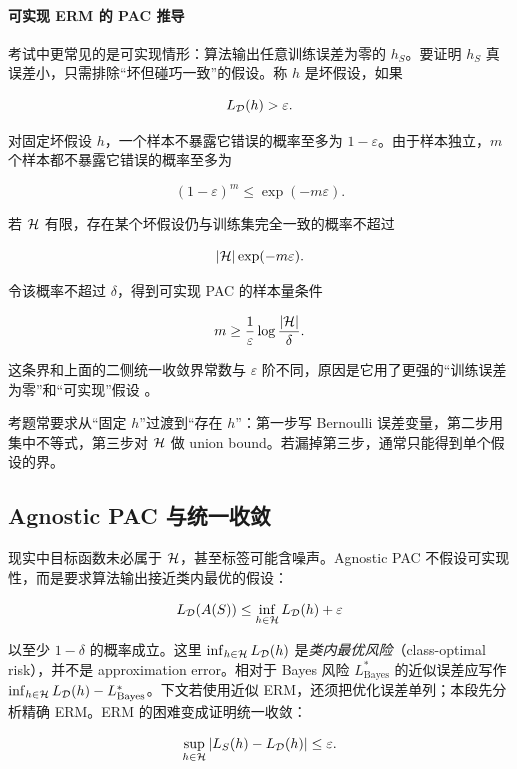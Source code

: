 \paragraph{可实现 ERM 的 PAC 推导}

考试中更常见的是可实现情形：算法输出任意训练误差为零的 \(h_S\)。要证明 \(h_S\) 真误差小，只需排除“坏但碰巧一致”的假设。称 \(h\) 是坏假设，如果

\[
  L_{\mathcal{D}}(h)>\varepsilon.
\]

对固定坏假设 \(h\)，一个样本不暴露它错误的概率至多为 \(1-\varepsilon\)。由于样本独立，\(m\) 个样本都不暴露它错误的概率至多为

\[
  (1-\varepsilon)^m
  \le
  \exp(-m\varepsilon).
\]

若 \(\mathcal{H}\) 有限，存在某个坏假设仍与训练集完全一致的概率不超过

\[
  |\mathcal{H}|\exp(-m\varepsilon).
\]

令该概率不超过 \(\delta\)，得到可实现 PAC 的样本量条件

\[
  m
  \ge
  \frac{1}{\varepsilon}
  \log\frac{|\mathcal{H}|}{\delta}.
\]

这条界和上面的二侧统一收敛界常数与 \(\varepsilon\) 阶不同，原因是它用了更强的“训练误差为零”和“可实现”假设 \parencite{shalev2014uml,mohri2018foundations}。

\examnote
考题常要求从“固定 \(h\)”过渡到“存在 \(h\)”：第一步写 Bernoulli 误差变量，第二步用集中不等式，第三步对 \(\mathcal{H}\) 做 union bound。若漏掉第三步，通常只能得到单个假设的界。

\subsection{Agnostic PAC 与统一收敛}


现实中目标函数未必属于 \(\mathcal{H}\)，甚至标签可能含噪声。Agnostic PAC 不假设可实现性，而是要求算法输出接近类内最优的假设：

\[
  L_{\mathcal{D}}(A(S))
  \le
  \inf_{h\in\mathcal{H}}L_{\mathcal{D}}(h)+\varepsilon
\]

以至少 \(1-\delta\) 的概率成立。这里 \(\inf_{h\in\mathcal{H}}L_{\mathcal{D}}(h)\) 是\emph{类内最优风险}（class-optimal risk），并不是 approximation error。相对于 Bayes 风险 \(L^*_{\mathrm{Bayes}}\) 的近似误差应写作 \(\inf_{h\in\mathcal{H}}L_{\mathcal{D}}(h)-L^*_{\mathrm{Bayes}}\)。下文若使用近似 ERM，还须把优化误差单列；本段先分析精确 ERM。ERM 的困难变成证明统一收敛：

\[
  \sup_{h\in\mathcal{H}}
  |L_S(h)-L_{\mathcal{D}}(h)|
  \le \varepsilon.
\]

